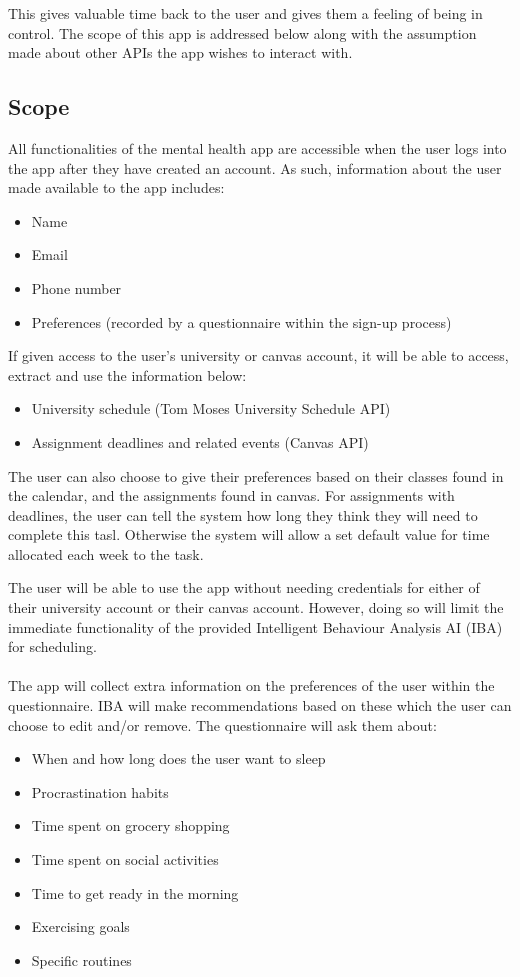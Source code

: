 \documentclass[a4paper,11pt]{article} %
\begin{document}
This gives valuable time back to the user and gives them a feeling of being in control. The scope 
of this app is addressed below along with the assumption made about other APIs the app wishes 
to interact with.

\subsection{Scope}
All functionalities of the mental health app are accessible when the user logs into the app after they 
have created an account. As such, information about the user made available to the app includes:
\begin{itemize}
    \item Name
    \item Email
    \item Phone number
    \item Preferences (recorded by a questionnaire within the sign-up process)
\end{itemize}
\newpage
If given access to the user's university or canvas account, it will be able to access, extract and use 
the information below:
\begin{itemize}
    \item University schedule (Tom Moses University Schedule API)
    \item Assignment deadlines and related events (Canvas API)
\end{itemize}

The user can also choose to give their preferences based on their classes found in the calendar, 
and the assignments found in canvas.
For assignments with deadlines, the user can tell the system how long they think they will need 
to complete this tasl.
Otherwise the system will allow a set default value for time allocated each week to the task. 

The user will be able to use the app without needing credentials for either of their university account 
or their canvas account. However, doing so will limit the immediate functionality of the provided 
Intelligent Behaviour Analysis AI (IBA) for scheduling.
\\
\\
The app will collect extra information on the preferences of the user within the questionnaire. IBA will make recommendations based on these which the user can choose to edit and/or remove. The questionnaire will ask them about:
\begin{itemize}
    \item When and how long does the user want to sleep
    \item Procrastination habits
    \item Time spent on grocery shopping
    \item Time spent on social activities
    \item Time to get ready in the morning
    \item Exercising goals
    \item Specific routines
\end{itemize}
\end{document}
